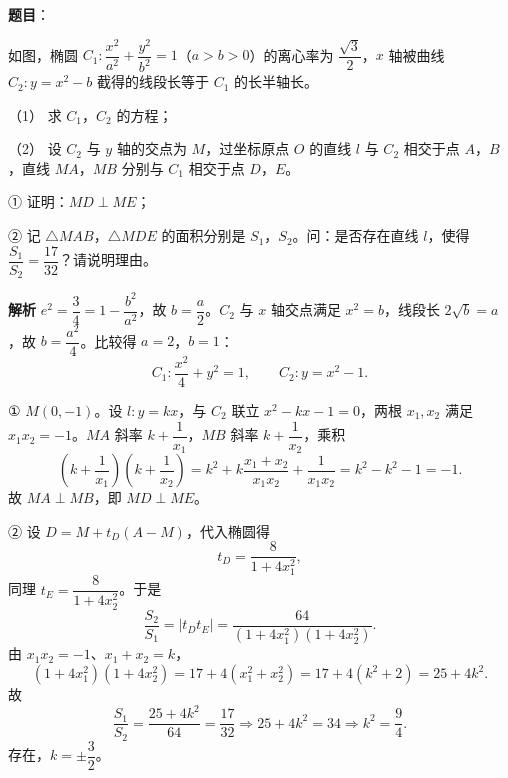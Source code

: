 \begin{answer}

\textbf{题目}：

如图，椭圆 $C_1:\dfrac{x^2}{a^2}+\dfrac{y^2}{b^2}=1$（$a>b>0$）的离心率为 $\dfrac{\sqrt3}2$，$x$ 轴被曲线 $C_2:y=x^2-b$ 截得的线段长等于 $C_1$ 的长半轴长。

（1） 求 $C_1$，$C_2$ 的方程；

（2） 设 $C_2$ 与 $y$ 轴的交点为 $M$，过坐标原点 $O$ 的直线 $l$ 与 $C_2$ 相交于点 $A$，$B$，直线 $MA$，$MB$ 分别与 $C_1$ 相交于点 $D$，$E$。

① 证明：$MD\perp ME$；

② 记 $\triangle MAB$，$\triangle MDE$ 的面积分别是 $S_1$，$S_2$。问：是否存在直线 $l$，使得 $\dfrac{S_1}{S_2}=\dfrac{17}{32}$？请说明理由。
\nopagebreak[4]
\begin{center}\end{center}
\nopagebreak[4]
\textbf{解析}
$e^2=\dfrac34=1-\dfrac{b^2}{a^2}$，故 $b=\dfrac a2$。$C_2$ 与 $x$ 轴交点满足 $x^2=b$，线段长 $2\sqrt b=a$，故 $b=\dfrac{a^2}4$。比较得 $a=2$，$b=1$：
\nopagebreak[4]
\[C_1:\frac{x^2}4+y^2=1,\qquad C_2:y=x^2-1.\]

① $M(0,-1)$。设 $l:y=kx$，与 $C_2$ 联立 $x^2-kx-1=0$，两根 $x_1,x_2$ 满足 $x_1x_2=-1$。$MA$ 斜率 $k+\dfrac1{x_1}$，$MB$ 斜率 $k+\dfrac1{x_2}$，乘积
\nopagebreak[4]
\[\left(k+\frac1{x_1}\right)\left(k+\frac1{x_2}\right)=k^2+k\frac{x_1+x_2}{x_1x_2}+\frac1{x_1x_2}=k^2-k^2-1=-1.\]
故 $MA\perp MB$，即 $MD\perp ME$。

② 设 $D=M+t_D(A-M)$，代入椭圆得
\nopagebreak[4]
\[t_D=\frac{8}{1+4x_1^2},\]
同理 $t_E=\dfrac{8}{1+4x_2^2}$。于是
\nopagebreak[4]
\[\frac{S_2}{S_1}=|t_Dt_E|=\frac{64}{(1+4x_1^2)(1+4x_2^2)}.\]
由 $x_1x_2=-1$、$x_1+x_2=k$，
\nopagebreak[4]
\[(1+4x_1^2)(1+4x_2^2)=17+4(x_1^2+x_2^2)=17+4(k^2+2)=25+4k^2.\]
故
\nopagebreak[4]
\[\frac{S_1}{S_2}=\frac{25+4k^2}{64}=\frac{17}{32}\Longrightarrow25+4k^2=34\Longrightarrow k^2=\frac94.\]
存在，$k=\pm\dfrac32$。



\end{answer}
